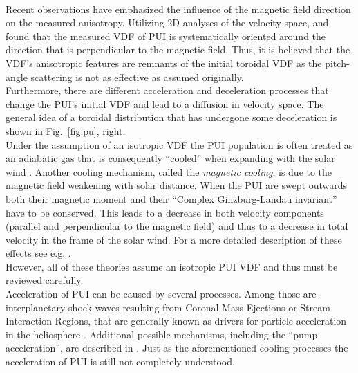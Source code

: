 \\
Recent observations have emphasized the influence of the magnetic field direction on the measured anisotropy. Utilizing 2D analyses of the velocity space, \citet{oka_2002} and \citet{drews_2015} found that the measured VDF of PUI is systematically oriented around the direction that is perpendicular to the magnetic field. Thus, it is believed that the VDF's anisotropic features are remnants of the initial toroidal VDF as the pitch-angle scattering is not as effective as assumed originally.\\
Furthermore, there are different acceleration and deceleration processes that change the PUI's initial VDF and lead to a diffusion in velocity space. The general idea of a toroidal distribution that has undergone some deceleration is shown in Fig.~\ref{fig:pu}, right.\\
Under the assumption of an isotropic VDF the PUI population is often treated as an adiabatic gas that is consequently ``cooled'' when expanding with the solar wind \citep{vasyl_siscoe_1976}. Another cooling mechanism, called the \textit{magnetic cooling}, is due to the magnetic field weakening with solar distance. When the PUI are swept outwards both their magnetic moment and their ``Complex Ginzburg-Landau invariant'' \citep{fahr} have to be conserved. This leads to a decrease in both velocity components (parallel and perpendicular to the magnetic field) and thus to a decrease in total velocity in the frame of the solar wind. For a more detailed description of these effects see e.g. \citet{fahr_fichtner}.\\
However, all of these theories assume an isotropic PUI VDF and thus must be reviewed carefully.\\
Acceleration of PUI can be caused by several processes. Among those are interplanetary shock waves resulting from Coronal Mass Ejections or Stream Interaction Regions, that are generally known as drivers for particle acceleration in the heliosphere \citep[Ch. 7.5]{kallenrode}. Additional possible mechanisms, including the ``pump acceleration'', are described in \citet{fisk_gloeckler2012}. Just as the aforementioned cooling processes the acceleration of PUI is still not completely understood.